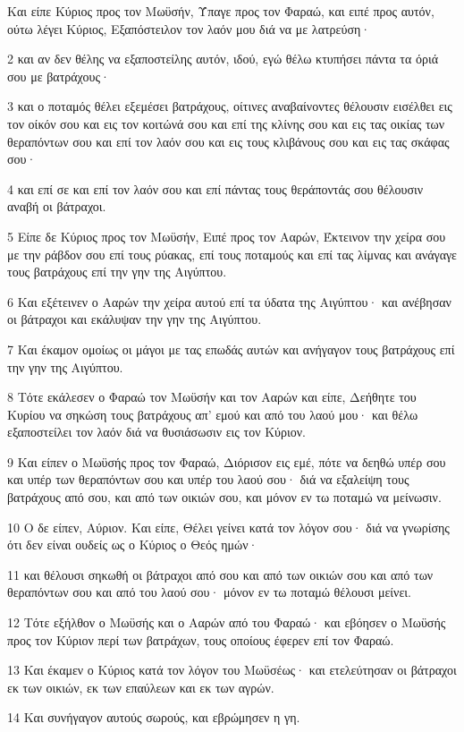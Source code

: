\par Και είπε Κύριος προς τον Μωϋσήν, Ύπαγε προς τον Φαραώ, και ειπέ προς αυτόν, ούτω λέγει Κύριος, Εξαπόστειλον τον λαόν μου διά να με λατρεύση·
\par 2 και αν δεν θέλης να εξαποστείλης αυτόν, ιδού, εγώ θέλω κτυπήσει πάντα τα όριά σου με βατράχους·
\par 3 και ο ποταμός θέλει εξεμέσει βατράχους, οίτινες αναβαίνοντες θέλουσιν εισέλθει εις τον οίκόν σου και εις τον κοιτώνά σου και επί της κλίνης σου και εις τας οικίας των θεραπόντων σου και επί τον λαόν σου και εις τους κλιβάνους σου και εις τας σκάφας σου·
\par 4 και επί σε και επί τον λαόν σου και επί πάντας τους θεράποντάς σου θέλουσιν αναβή οι βάτραχοι.
\par 5 Είπε δε Κύριος προς τον Μωϋσήν, Ειπέ προς τον Ααρών, Έκτεινον την χείρα σου με την ράβδον σου επί τους ρύακας, επί τους ποταμούς και επί τας λίμνας και ανάγαγε τους βατράχους επί την γην της Αιγύπτου.
\par 6 Και εξέτεινεν ο Ααρών την χείρα αυτού επί τα ύδατα της Αιγύπτου· και ανέβησαν οι βάτραχοι και εκάλυψαν την γην της Αιγύπτου.
\par 7 Και έκαμον ομοίως οι μάγοι με τας επωδάς αυτών και ανήγαγον τους βατράχους επί την γην της Αιγύπτου.
\par 8 Τότε εκάλεσεν ο Φαραώ τον Μωϋσήν και τον Ααρών και είπε, Δεήθητε του Κυρίου να σηκώση τους βατράχους απ' εμού και από του λαού μου· και θέλω εξαποστείλει τον λαόν διά να θυσιάσωσιν εις τον Κύριον.
\par 9 Και είπεν ο Μωϋσής προς τον Φαραώ, Διόρισον εις εμέ, πότε να δεηθώ υπέρ σου και υπέρ των θεραπόντων σου και υπέρ του λαού σου· διά να εξαλείψη τους βατράχους από σου, και από των οικιών σου, και μόνον εν τω ποταμώ να μείνωσιν.
\par 10 Ο δε είπεν, Αύριον. Και είπε, Θέλει γείνει κατά τον λόγον σου· διά να γνωρίσης ότι δεν είναι ουδείς ως ο Κύριος ο Θεός ημών·
\par 11 και θέλουσι σηκωθή οι βάτραχοι από σου και από των οικιών σου και από των θεραπόντων σου και από του λαού σου· μόνον εν τω ποταμώ θέλουσι μείνει.
\par 12 Τότε εξήλθον ο Μωϋσής και ο Ααρών από του Φαραώ· και εβόησεν ο Μωϋσής προς τον Κύριον περί των βατράχων, τους οποίους έφερεν επί τον Φαραώ.
\par 13 Και έκαμεν ο Κύριος κατά τον λόγον του Μωϋσέως· και ετελεύτησαν οι βάτραχοι εκ των οικιών, εκ των επαύλεων και εκ των αγρών.
\par 14 Και συνήγαγον αυτούς σωρούς, και εβρώμησεν η γη.
